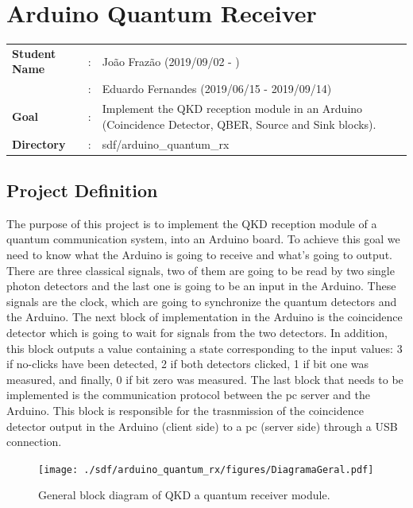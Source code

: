 \clearpage
\section{Arduino Quantum Receiver}

\begin{refsection}
	
	\begin{tcolorbox}	
		\begin{tabular}{p{2.75cm} p{0.2cm} p{10.5cm}} 	
			\textbf{Student Name}  		&:&  Jo\~ao Fraz\~ao (2019/09/02 - )\\
			&:&  Eduardo Fernandes (2019/06/15 - 2019/09/14)\\
			\textbf{Goal}          &:& Implement the QKD reception module in an Arduino (Coincidence Detector, QBER, Source and Sink blocks).\\
			\textbf{Directory}              &:& sdf/arduino\_quantum\_rx
		\end{tabular}
	\end{tcolorbox}
	
	
	\subsection{Project Definition}
	
		The purpose of this project is to implement the QKD reception module of a quantum communication system, into an Arduino board. To achieve this goal we need to know what the Arduino is going to receive and what's going to output.
		There are three classical signals, two of them are going to be read by two single photon detectors and the last one is going to be an input in the Arduino. These signals are the clock, which are going to synchronize the quantum detectors and the Arduino. The next block of implementation in the Arduino is the coincidence detector which is going to wait for signals from the two detectors. In addition, this block outputs a value containing a state corresponding to the input values: 3 if no-clicks have been detected, 2 if both detectors clicked, 1 if bit one was measured, and finally, 0 if bit zero was measured. The last block that needs to be implemented is the communication protocol between the pc server and the Arduino. This block is responsible for the trasnmission of the coincidence detector output in the Arduino (client side) to a pc (server side) through a USB connection.  
		
	\begin{figure}[H]
		\centering
		\texttt{[image: ./sdf/arduino\_quantum\_rx/figures/DiagramaGeral.pdf]}
		\caption{General block diagram of QKD a quantum receiver module.}
		\label{fig:arduino}
		

\end{figure}
\end{refsection}
